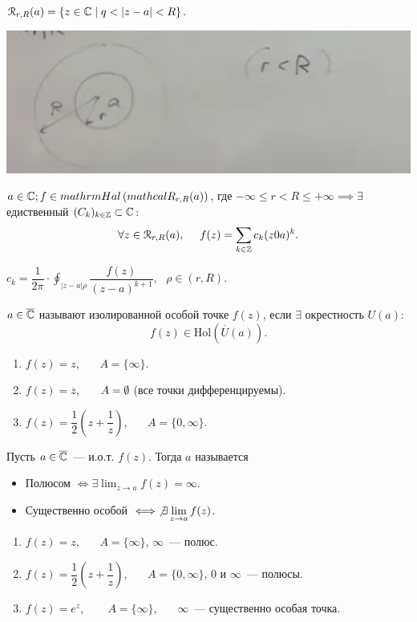 $\mathcal{R} _{r, R} (a ) = \{ z \in \mathbb{C} \mid q < |z -a | < R\}$.

\includegraphics[scale=0.6]{img/convergence_ring_Laurent_series.png}

$a \in \mathbb{C}; f \in mathrm{Hal} \left(mathcal R _{r, R} (a)\right)$, где $-\infty \leqslant r < R \leqslant +\infty \implies \exists $ едиственный $(C_k)_{k\in \mathbb{Z}}\subset \mathbb{C} $:
\[\forall z \in \mathcal{R}_{r, R}(a),~~~~
f(z) = \sum_{k\in\Z} c_k (z 0 a )^k.
    \]

$c_k = \dfrac{1}{2\pi} \cdot \oint_{|z -a | \rho } \dfrac{f(z)}{(z - a) ^{k + 1}},~~~\rho \in (r, R) $.

\begin{definition}
    $a \in \overline{\mathbb{C}}$ называют изолированной особой точке $f(z)$, если $\exists$ окрестность $U(a)$:
    \[ f(z) \in \mathrm{Hol}(\overset{\cdot } {U} (a)). \]
\end{definition}
\begin{example}
\begin{enumerate}
    \item $f(z) = z$,~~~ $A = \{\infty  \}$.
    \item $f(z) = \overline{z}$,~~~ $ A = \emptyset$ (все точки дифференцируемы).
    \item $f(z ) = \dfrac{1}{2} \left( z + \dfrac{1}{z} \right)$,~~~ $A = \{ 0, \infty\}$.
\end{enumerate}
\end{example}


\begin{definition}
    Пусть $a \in \overline{\mathbb{C}}$~--- и.о.т. $f(z)$. Тогда $a$ называется
    \begin{itemize}
        \item Полюсом $\iff \exists \lim_{z\to a} f(z) = \infty$.
        \item Существенно особой $\iff \not \exists \lim_{z\to a} f(z)$.
    \end{itemize}
\end{definition}

\begin{example}
\begin{enumerate}
    \item $f(z) = z$,~~~ $A = \{\infty  \}$, $\infty$~--- полюс.
    \item $f(z) = \dfrac{1}{2} \left( z + \dfrac{1}{z} \right)$,~~~ $A = \{ 0, \infty\}$, $0$ и $\infty$~--- полюсы.
    \item $f(z) = e^z$, ~~~ $A = \{\infty\}$,~~~ $\infty$~--- существенно особая точка.
\end{enumerate}
\end{example}

